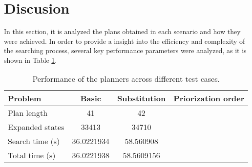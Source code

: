 \section{Discusion}
In this section, it is analyzed the plans obtained in each scenario and how they were achieved. In order to provide a insight into the 
efficiency and complexity of the searching process, several key performance parameters were analyzed, as it is shown in Table \ref{tab:tabla}. 

\begin{table}[H]
    \centering
    \begin{tabular}{|l|c|c|c|}
    \hline
    Problem         & Basic & Substitution & Priorization order \\ \hline
    Plan length     &  41     &    42          &                    \\ \hline
    Expanded states &    33413   &     34710         &                    \\ \hline
    Search time (s)    & 36.0221934      &    58.560908       &                    \\ \hline
    Total time (s)     &   36.0221938     &     58.5609156           &                    \\ \hline
    \end{tabular}\label{tab:tabla}
    \caption{Performance of the planners across different test cases.}
\end{table}
